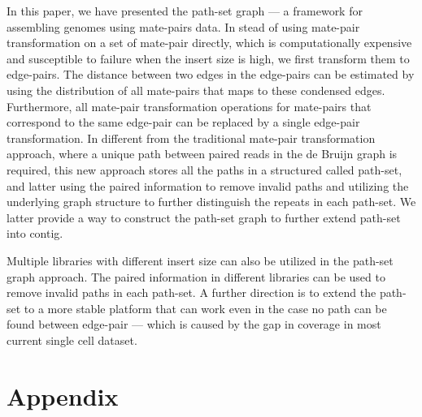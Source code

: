 \documentclass[12pt,a4paper,oneside]{article}
\begin{document}
In this paper, we have presented the path-set graph --- a framework for assembling genomes using mate-pairs data. In stead of 
using mate-pair transformation on a set of mate-pair directly, which is computationally expensive and 
susceptible to failure when the insert size is high, we first transform them to edge-pairs. The distance between 
two edges in the edge-pairs can be estimated by using the distribution of all mate-pairs that maps to these condensed
edges. Furthermore, all mate-pair transformation operations for mate-pairs that correspond to the same 
edge-pair can be replaced by a single edge-pair transformation.
In different from the traditional mate-pair transformation approach, where a unique path between paired reads in the de Bruijn graph is required,
this new approach stores  all the paths in a structured called path-set, and latter using the paired information to remove invalid paths and utilizing 
the underlying graph structure to further distinguish the repeats in each path-set. We latter provide a way to construct the path-set graph to further 
extend path-set into contig. 

Multiple libraries with different insert size can also be utilized in the path-set graph approach. The paired information in different libraries can be used to 
remove invalid paths in each path-set. A further direction is to extend the path-set to a more stable platform that can work even in the case no path can be found 
between edge-pair --- which is caused by the gap in coverage in most current single cell dataset. 
 



\section{Appendix}











\end{document}
